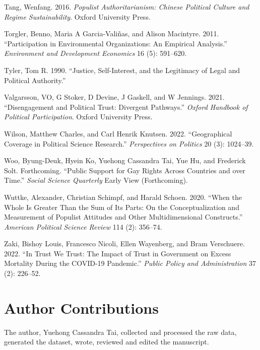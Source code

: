 \documentclass[
  12pt,
]{article}
\newlength{\cslhangindent}
\newenvironment{CSLReferences}[2] %
 {\begin{list}{}{%
  \setlength{\itemindent}{0pt}
  \setlength{\leftmargin}{0pt}
  \setlength{\parsep}{0pt}
  \ifodd #1
   \setlength{\leftmargin}{\cslhangindent}
   \setlength{\itemindent}{-1\cslhangindent}
  \fi
  \setlength{\itemsep}{#2\baselineskip}}}
 {\end{list}}
\begin{document}
\begin{CSLReferences}{1}{0}
Tang, Wenfang. 2016. \emph{Populist Authoritarianism: Chinese Political Culture and Regime Sustainability}. Oxford University Press.

Torgler, Benno, Maria A Garcia-Valiñas, and Alison Macintyre. 2011. {``Participation in Environmental Organizations: An Empirical Analysis.''} \emph{Environment and Development Economics} 16 (5): 591--620.

Tyler, Tom R. 1990. {``Justice, Self-Interest, and the Legitimacy of Legal and Political Authority.''}

Valgarsson, VO, G Stoker, D Devine, J Gaskell, and W Jennings. 2021. {``Disengagement and Political Trust: Divergent Pathways.''} \emph{Oxford Handbook of Political Participation}. Oxford University Press.

Wilson, Matthew Charles, and Carl Henrik Knutsen. 2022. {``Geographical Coverage in Political Science Research.''} \emph{Perspectives on Politics} 20 (3): 1024--39.

Woo, Byung-Deuk, Hyein Ko, Yuehong Cassandra Tai, Yue Hu, and Frederick Solt. Forthcoming. {``Public Support for Gay Rights Across Countries and over Time.''} \emph{Social Science Quarterly} Early View (Forthcoming).

Wuttke, Alexander, Christian Schimpf, and Harald Schoen. 2020. {``When the Whole Is Greater Than the Sum of Its Parts: On the Conceptualization and Measurement of Populist Attitudes and Other Multidimensional Constructs.''} \emph{American Political Science Review} 114 (2): 356--74.

Zaki, Bishoy Louis, Francesco Nicoli, Ellen Wayenberg, and Bram Verschuere. 2022. {``In Trust We Trust: The Impact of Trust in Government on Excess Mortality During the COVID-19 Pandemic.''} \emph{Public Policy and Administration} 37 (2): 226--52.

\end{CSLReferences}

\section{Author Contributions}\label{author-contributions}

The author, Yuehong Cassandra Tai, collected and processed the raw data, generated the dataset, wrote, reviewed and edited the manuscript.
\end{document}
